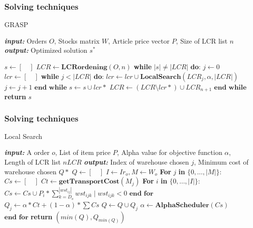 \documentclass[t,compress,11pt,xcolor=dvipsnames,pdf,english]{beamer}
\begin{document}
\begin{frame}[c]{ }
\frametitle{Solving techniques}
    \large
    GRASP
    \small

    \begin{algorithmic}[1]
        \STATE \textbf{\emph{input:}} Orders $O$, Stocks matrix $W$, Article price vector $P$, Size of LCR list $n$
        \STATE \textbf{\emph{output:}} Optimized solution $s^*$
        
        \STATE $s \longleftarrow [\quad] $
        \STATE $LCR \longleftarrow \textbf{LCRordening}(O, n)$
        \STATE \textbf{while } $|s| \neq |LCR|$ \textbf{do}:\label{1grasp}
        \STATE \quad $j \longleftarrow 0 $
        \STATE \quad $lcr \longleftarrow [\quad]$
        \STATE \quad \textbf{while } $j < |LCR|$ \textbf{do}:
        \STATE \quad \quad $lcr \longleftarrow lcr \cup \textbf{LocalSearch}(LCR_j,\alpha,|LCR|)$
        \STATE \quad \quad $j \longleftarrow j + 1$
        \STATE \quad $\textbf{end while}$
        \STATE \quad $s \longleftarrow s \cup lcr*$ 
        \STATE \quad $LCR \longleftarrow (LCR \setminus lcr*) \cup  LCR_{n+1} $ 
        \STATE $\textbf{end while}$\label{2grasp}
        \STATE \textbf{return }$s$
    \end{algorithmic}
\end{frame}

\begin{frame}[c]{ }
    \frametitle{Solving techniques}
    \large
    Local Search
    \small

    \begin{algorithmic}[1]
        \STATE \textbf{\emph{input:}} A order $o$, List of item price $P$, Alpha value for objective function $\alpha$, Length of LCR list $nLCR$
        \STATE \textbf{\emph{output:}} Index of warehouse chosen $j$, Minimum cost of warehouse chosen $Q*$
        \STATE  $Q \longleftarrow [\quad]$
        \STATE  $I \longleftarrow Ir_{o}, M \longleftarrow W_{o}$
        \STATE  \textbf{For} $j$ \textbf{in} $\{ 0,\dots,|M|\}$:
        \STATE  \quad $Cs \longleftarrow [\quad]$
        \STATE  \quad $Ct \longleftarrow \textbf{getTransportCost}(M_j) $
        \STATE  \quad \textbf{For} $i$ \textbf{in} $\{ 0,\dots,|I|\}$:
        \STATE  \quad \quad$Cs \longleftarrow Cs \cup P_i * \sum_{k=D_{o}}^{|wst_{ij}|} wst_{ijk}\; |\; wst_{ijk} < 0 $
        \STATE  \quad  $\textbf{end for}$
        \STATE  \quad $Q_j \longleftarrow \alpha * Ct + (1 - \alpha) * \sum Cs$
        \STATE  \quad $Q \longleftarrow Q \cup Q_j$
        \STATE  \quad $\alpha \longleftarrow \textbf{AlphaScheduler}(Cs) $
        \STATE  $\textbf{end for}$
        \STATE  \textbf{return }$\left( min(Q) , Q_{min(Q)} \right)$
    \end{algorithmic}
\end{frame}
\end{document}
